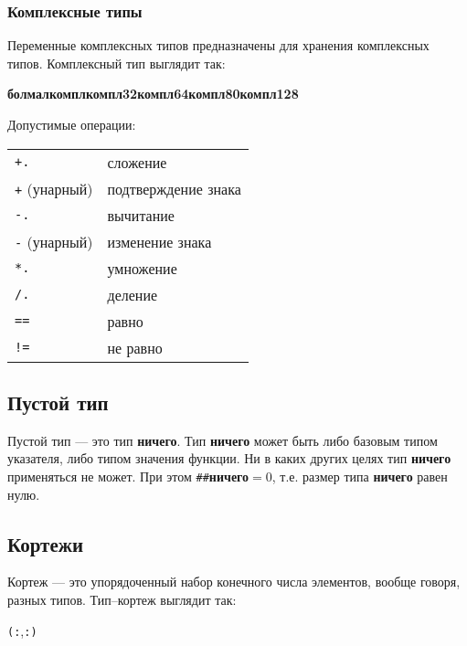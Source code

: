\documentclass[10pt]{report}
\begin{document}
\subsubsection{Комплексные типы}          
Переменные комплексных типов предназначены для хранения комплексных типов. Комплексный тип выглядит так:
\begin{center}
	\noindent\rbo\textbf{бол}\kleene\sor\textbf{мал}\kleene\rbc\textbf{компл}\sor\textbf{компл32}\sor\textbf{компл64}\sor\textbf{компл80}\sor\textbf{компл128}
\end{center}

Допустимые операции:
\begin{longtable}{ll}
	\texttt{+.}             & сложение                                          \\
	\texttt{+} (унарный)    & подтверждение знака                               \\
	\texttt{-.}             & вычитание                                         \\
	\texttt{-} (унарный)    & изменение знака                                   \\
	\texttt{*.}             & умножение                                         \\
	\texttt{/.}             & деление                                           \\
	\texttt{==}             & равно                                             \\
	\texttt{!=}             & не равно                                          \\
\end{longtable}

\subsection{Пустой тип}
Пустой тип --- это тип \textbf{ничего}. Тип \textbf{ничего} может быть либо базовым типом указателя, либо типом значения функции. Ни в каких других целях тип \textbf{ничего} применяться не может. При этом \texttt{\#\#}\textbf{ничего}$=0$, т.е. размер типа \textbf{ничего} равен нулю.

\subsection{Кортежи}
Кортеж --- это упорядоченный набор конечного числа элементов, вообще говоря, разных типов. Тип--кортеж выглядит так:
\begin{center}
	\noindent\texttt{(:}\rbo{}\rbo,\rbc\kleene\rbc\optional\texttt{:)}
\end{center}        
\end{document}
